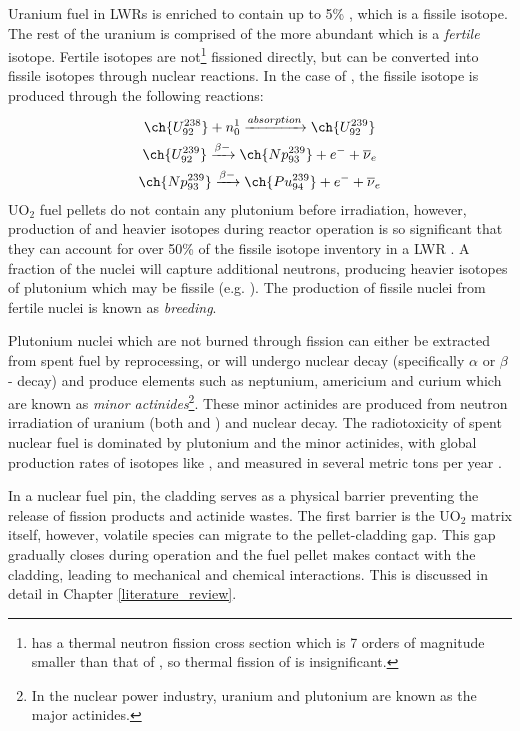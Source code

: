 Uranium fuel in LWRs is enriched to contain up to 5\% , which is a fissile isotope. The rest of the uranium is comprised of the more abundant  which is a \emph{fertile} isotope. Fertile isotopes are not\footnote{ has a thermal neutron fission cross section which is 7 orders of magnitude smaller than that of , so thermal fission of  is insignificant.} fissioned directly, but can be converted into fissile isotopes through nuclear reactions. In the case of , the fissile isotope  is produced through the following reactions:
\begin{gather}
\ch{U^{238}_{92}} + n^{1}_{0} \xrightarrow[]{absorption} \ch{U^{239}_{92}} \\
\ch{U^{239}_{92}} \xrightarrow[]{\beta-} \ch{Np^{239}_{93}} + e^{-} + \overline{\nu}_{e} \\
\ch{Np^{239}_{93}} \xrightarrow[]{\beta-} \ch{Pu^{239}_{94}} + e^{-} + \overline{\nu}_{e}
\end{gather}
UO$_{2}$ fuel pellets do not contain any plutonium before irradiation, however, production of  and heavier isotopes during reactor operation is so significant that they can account for over 50\% of the fissile isotope inventory in a LWR \cite{OECD1989}. A fraction of the  nuclei will capture additional neutrons, producing heavier isotopes of plutonium which may be fissile (e.g. ). The production of fissile nuclei from fertile nuclei is known as \emph{breeding}.

Plutonium nuclei which are not burned through fission can either be extracted from spent fuel by reprocessing, or will undergo nuclear decay (specifically $\alpha$ or $\beta$- decay) and produce elements such as neptunium, americium and curium which are known as \emph{minor actinides}\footnote{In the nuclear power industry, uranium and plutonium are known as the major actinides.}. These minor actinides are produced from neutron irradiation of uranium (both  and ) and nuclear decay. The radiotoxicity of spent nuclear fuel is dominated by plutonium and the minor actinides, with global production rates of isotopes like ,  and  measured in several metric tons per year \cite{Ewing2004}. 

In a nuclear fuel pin, the cladding serves as a physical barrier preventing the release of fission products and actinide wastes. The first barrier is the UO$_{2}$ matrix itself, however, volatile species can migrate to the pellet-cladding gap. This gap gradually closes during operation and the fuel pellet makes contact with the cladding, leading to mechanical and chemical interactions. This is discussed in detail in Chapter \ref{literature_review}.